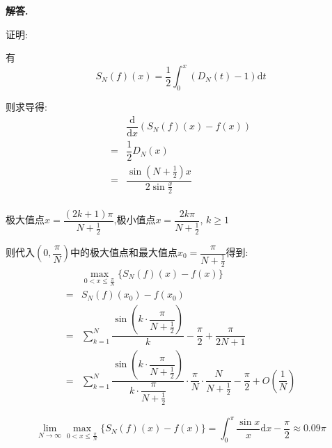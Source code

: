 \documentclass[12pt, a4paper, oneside]{ctexart}
\newenvironment{solution}{\par\noindent\textbf{解答. }}{\par}
\begin{document}
\begin{solution}
\par
证明:
\par
有
$$
S_N(f)(x)=\dfrac{1}{2}\int_{0}^{x}(D_N(t)-1)\mathrm{d}t
$$
\par
则求导得:
$$
\begin{aligned}
&\dfrac{\mathrm{d}}{\mathrm{d}x}\left(S_N(f)(x)-f(x)\right)\\
=&\dfrac{1}{2}D_N(x)\\
=&\dfrac{\sin(N+\frac{1}{2})x}{2\sin \frac{x}{2}}\\
\end{aligned}
$$
\par
极大值点$x=\dfrac{(2k+1)\pi}{N+\frac{1}{2}}$,极小值点$x=\dfrac{2k\pi}{N+\frac{1}{2}}$, $k\geqslant 1$
\par
则代入$\left(0,\dfrac{\pi}{N}\right)$中的极大值点和最大值点$x_0=\dfrac{\pi}{N+\frac{1}{2}}$得到:
$$
\begin{aligned}
    &\max_{0<x\leqslant \frac{\pi}{N}}\{S_N(f)(x)-f(x)\}\\
=&S_N(f)(x_0)-f(x_0)\\
=& \sum_{k=1}^{N} \dfrac{\sin \left(k\cdot \dfrac{\pi}{N+\frac{1}{2}}\right)}{k}
-\dfrac{\pi}{2} +\dfrac{\pi}{2N+1}\\
=& \sum_{k=1}^{N} \dfrac{\sin \left(k\cdot \dfrac{\pi}{N+\frac{1}{2}}\right)}{k
\cdot \dfrac{\pi}{N+\frac{1}{2}}}\cdot \dfrac{\pi}{N}\cdot \dfrac{N}{N+\frac{1}{2}}
-\dfrac{\pi}{2} +O\left(\dfrac{1}{N}\right)
\end{aligned}
$$
\par
$$
\lim_{N \to \infty}\max_{0<x\leqslant \frac{\pi}{N}}\{S_N(f)(x)-f(x)\}=\int_{0}^{\pi}\dfrac{\sin x}{x}\mathrm{d}x-\dfrac{\pi}{2}\approx 0.09\pi
$$
\end{solution}
\end{document}
